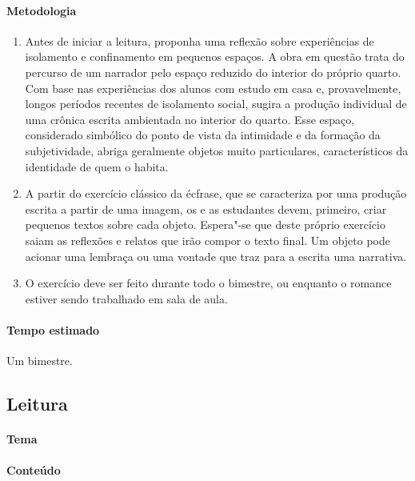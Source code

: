 \documentclass[12pt]{extarticle}
\begin{document}
\paragraph{Metodologia}
\begin{enumerate}
	\item
	Antes de iniciar a leitura, proponha uma reflexão sobre
experiências de isolamento e confinamento em pequenos espaços. A obra em
questão trata do percurso de um narrador pelo espaço reduzido do
interior do próprio quarto. Com base nas experiências dos alunos com
estudo em casa e, provavelmente, longos períodos recentes de isolamento
social, sugira a produção individual de uma crônica escrita
ambientada no interior do quarto. Esse espaço, considerado simbólico do
ponto de vista da intimidade e da formação da subjetividade, abriga
geralmente objetos muito particulares, característicos da identidade de
quem o habita.
	\item
	A partir do exercício clássico da écfrase, que se caracteriza por uma
	produção escrita a partir de uma imagem, os e as estudantes devem, primeiro,
	criar pequenos textos sobre cada objeto. Espera"-se que deste próprio
	exercício saiam as reflexões e relatos que irão compor o texto final.
	Um objeto pode acionar uma lembraça ou uma vontade que traz para a escrita
	uma narrativa. 
	\item 
	O exercício deve ser feito durante todo o bimestre, ou enquanto
	o romance estiver sendo trabalhado em sala de aula.

\end{enumerate}

\paragraph{Tempo estimado} Um bimestre.



\subsection{Leitura}


\paragraph{Tema}

\paragraph{Conteúdo}
\end{document}
